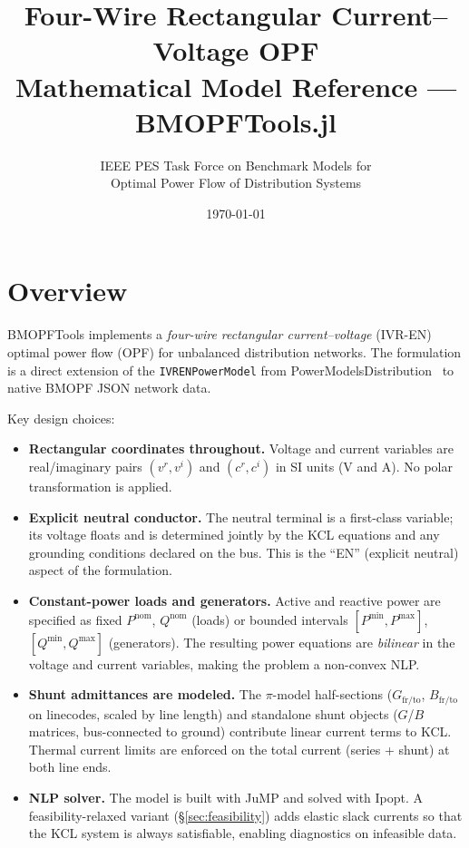 \documentclass[11pt,a4paper]{article}
\title{\textbf{Four-Wire Rectangular Current--Voltage OPF}\\[4pt]
       \large Mathematical Model Reference --- BMOPFTools.jl}
\author{IEEE PES Task Force on Benchmark Models for\\
        Optimal Power Flow of Distribution Systems}
\date{\today}
\begin{document}
\maketitle
\tableofcontents
\bigskip

\section{Overview}

BMOPFTools implements a \emph{four-wire rectangular current--voltage} (IVR-EN)
optimal power flow (OPF) for unbalanced distribution networks.  The formulation
is a direct extension of the \texttt{IVRENPowerModel} from
PowerModelsDistribution~\cite{PowerModelsDistribution2022} to native BMOPF JSON
network data.

Key design choices:
\begin{itemize}
  \item \textbf{Rectangular coordinates throughout.}  Voltage and current
        variables are real/imaginary pairs $(v^r, v^i)$ and $(c^r, c^i)$ in
        SI units (V and A).  No polar transformation is applied.

  \item \textbf{Explicit neutral conductor.}  The neutral terminal is a
        first-class variable; its voltage floats and is determined jointly by
        the KCL equations and any grounding conditions declared on the bus.
        This is the ``EN'' (explicit neutral) aspect of the formulation.

  \item \textbf{Constant-power loads and generators.}  Active and reactive
        power are specified as fixed $P^\text{nom}$, $Q^\text{nom}$ (loads) or
        bounded intervals $[P^\text{min}, P^\text{max}]$,
        $[Q^\text{min}, Q^\text{max}]$ (generators).  The resulting power
        equations are \emph{bilinear} in the voltage and current variables,
        making the problem a non-convex NLP.

  \item \textbf{Shunt admittances are modeled.}  The $\pi$-model half-sections
        ($G_\text{fr/to}$, $B_\text{fr/to}$ on linecodes, scaled by line length)
        and standalone shunt objects ($G$/$B$ matrices, bus-connected to ground)
        contribute linear current terms to KCL.  Thermal current limits are
        enforced on the total current (series + shunt) at both line ends.

  \item \textbf{NLP solver.}  The model is built with JuMP and solved with
        Ipopt.  A feasibility-relaxed variant (\S\ref{sec:feasibility}) adds
        elastic slack currents so that the KCL system is always satisfiable,
        enabling diagnostics on infeasible data.
\end{itemize}
\end{document}

